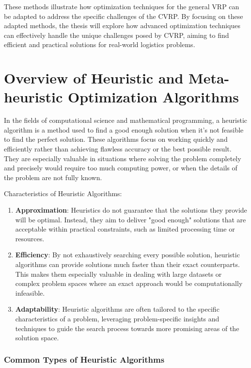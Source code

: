 \documentclass[
]{article}
\begin{document}
These methods illustrate how optimization techniques for the general VRP can be adapted to address the specific challenges of the CVRP. By focusing on these adapted methods, the thesis will explore how advanced optimization techniques can effectively handle the unique challenges posed by CVRP, aiming to find efficient and practical solutions for real-world logistics problems.

\hypertarget{overview-of-heuristic-and-meta-heuristic-optimization-algorithms}{%
  \section{Overview of Heuristic and Meta-heuristic Optimization Algorithms}\label{overview-of-heuristic-and-meta-heuristic-optimization-algorithms}}



In the fields of computational science and mathematical programming, a heuristic algorithm is a method used to find a good enough solution when it's not feasible to find the perfect solution. These algorithms focus on working quickly and efficiently rather than achieving flawless accuracy or the best possible result. They are especially valuable in situations where solving the problem completely and precisely would require too much computing power, or when the details of the problem are not fully known.

Characteristics of Heuristic Algorithms:
\begin{enumerate}
  \item \textbf{Approximation}: Heuristics do not guarantee that the solutions they provide will be optimal. Instead, they aim to deliver "good enough" solutions that are acceptable within practical constraints, such as limited processing time or resources.
  \item \textbf{Efficiency}: By not exhaustively searching every possible solution, heuristic algorithms can provide solutions much faster than their exact counterparts. This makes them especially valuable in dealing with large datasets or complex problem spaces where an exact approach would be computationally infeasible.
  \item \textbf{Adaptability}: Heuristic algorithms are often tailored to the specific characteristics of a problem, leveraging problem-specific insights and techniques to guide the search process towards more promising areas of the solution space.
\end{enumerate}


\hypertarget{common-types-of-heuristic-algorithms}{%
  \subsubsection{Common Types of Heuristic Algorithms}\label{common-types-of-heuristic-algorithms}}
\end{document}

